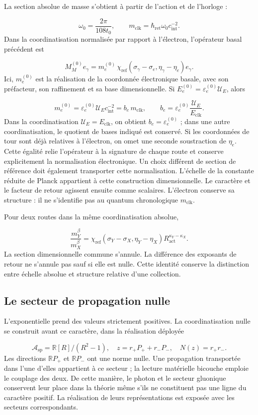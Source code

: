 La section absolue de masse s’obtient à partir de l’action et de l’horloge :

\[
 \omega_0=\frac{2\pi}{108t_0},\qquad
m_{\mathrm{clk}}=\hbar_{\mathrm{ret}}\omega_0c_{\mathrm{int}}^{-2}.
\]
Dans la coordinatisation normalisée par rapport à l’électron, l’opérateur basal précédent est

\[
 M_M^{(0)}e_\gamma
 =m_e^{(0)}\,
   \chi_{\mathrm{ref}}(\sigma_\gamma-\sigma_e,
                       \eta_\gamma-\eta_e)e_\gamma.
\]
Ici, \(m_e^{(0)}\) est la réalisation de la coordonnée électronique
basale, avec son préfacteur, son raffinement et sa base dimensionnelle.
Si \(E_e^{(0)}=\varepsilon_e^{(0)}\mathcal U_E\), alors

\[
 m_e^{(0)}=\varepsilon_e^{(0)}\mathcal U_Ec_{\mathrm{int}}^{-2}
 =b_e\,m_{\mathrm{clk}},\qquad
 b_e=\varepsilon_e^{(0)}\frac{\mathcal U_E}{E_{\mathrm{clk}}}.
\]
Dans la coordinatisation \(\mathcal U_E=E_{\mathrm{clk}}\), on obtient
\(b_e=\varepsilon_e^{(0)}\) ; dans une autre coordinatisation, le quotient
de bases indiqué est conservé. Si les coordonnées de tour sont déjà
relatives à l’électron, on omet une seconde soustraction de \(\eta_e\).
Cette égalité relie l’opérateur à la signature de chaque route et conserve
explicitement la normalisation électronique. Un choix différent de
section de référence doit également transporter cette normalisation.
L’échelle de la constante réduite de Planck appartient à cette construction
dimensionnelle. Le caractère et le facteur de retour agissent ensuite comme
scalaires. L’électron conserve sa structure : il ne s’identifie pas au
quantum chronologique \(m_{\mathrm{clk}}\).


Pour deux routes dans la même coordinatisation absolue,

\[
 \frac{m_Y^\beta}{m_X^\beta}
 =\chi_{\mathrm{ref}}(\sigma_Y-\sigma_X,\eta_Y-\eta_X)
 R_{\mathrm{act}}^{\kappa_Y-\kappa_X}.
\]
La section dimensionnelle commune s’annule. La différence des exposants de
retour ne s’annule pas sauf si elle est nulle. Cette identité conserve la
distinction entre échelle absolue et structure relative d’une collection.


\subsection{Le secteur de propagation nulle
}

L’exponentielle prend des valeurs strictement positives. La coordinatisation nulle se
construit avant ce caractère, dans la réalisation déployée

\[
 \mathcal A_{\mathrm{sp}}=\mathbb R[R]/(R^2-1),\quad
 z=r_+P_++r_-P_-,\quad N(z)=r_+r_-.
\]
Les directions \(\mathbb RP_+\) et \(\mathbb RP_-\) ont une norme
nulle. Une propagation transportée dans l’une d’elles appartient à ce secteur ;
la lecture matérielle bicouche emploie le couplage des deux. De cette manière,
le photon et le secteur gluonique conservent leur place dans la théorie même
s’ils ne constituent pas une ligne du caractère positif. La réalisation de leurs
représentations est exposée avec les secteurs correspondants.

